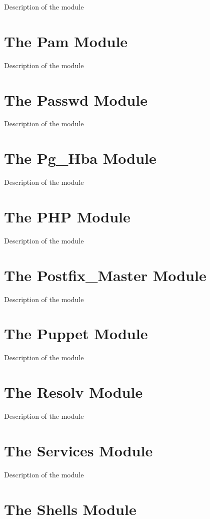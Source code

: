 Description of the module

\section{The Pam Module}

Description of the module

\section{The Passwd Module}

Description of the module

\section{The Pg\_Hba Module}

Description of the module

\section{The PHP Module}

Description of the module

\section{The Postfix\_Master Module}

Description of the module

\section{The Puppet Module}

Description of the module

\section{The Resolv Module}

Description of the module

\section{The Services Module}

Description of the module

\section{The Shells Module}

